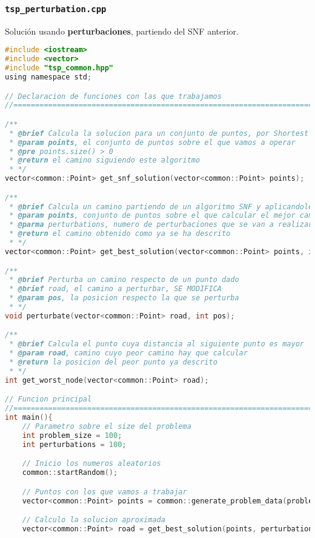 \documentclass[10pt, a4paper]{article}
\theoremstyle{theorem-style}
\theoremstyle{theorem-style}
\theoremstyle{definition-style}
\theoremstyle{remark-style}
\theoremstyle{example-style}
\theoremstyle{definition-style}
\theoremstyle{remark-style}
\begin{document}
\subsubsection*{\texttt{tsp\_perturbation.cpp}}

Solución usando \textbf{perturbaciones}, partiendo del SNF anterior.

\begin{lstlisting}[language=C]
#include <iostream>
#include <vector>
#include "tsp_common.hpp"
using namespace std;

// Declaracion de funciones con las que trabajamos
//==============================================================================

/**
 * @brief Calcula la solucion para un conjunto de puntos, por Shortest Neighbor First
 * @param points, el conjunto de puntos sobre el que vamos a operar
 * @pre points.size() > 0
 * @return el camino siguiendo este algoritmo
 * */
vector<common::Point> get_snf_solution(vector<common::Point> points);

/**
 * @brief Calcula un camino partiendo de un algoritmo SNF y aplicandole una serie de perturbaciones
 * @param points, conjunto de puntos sobre el que calcular el mejor camino posible
 * @parma perturbations, numero de perturbaciones que se van a realizar
 * @return el camino obtenido como ya se ha descrito
 * */
vector<common::Point> get_best_solution(vector<common::Point> points, int perturbations);

/**
 * @brief Perturba un camino respecto de un punto dado
 * @brief road, el camino a perturbar, SE MODIFICA
 * @param pos, la posicion respecto la que se perturba
 * */
void perturbate(vector<common::Point> road, int pos);

/**
 * @brief Calcula el punto cuya distancia al siguiente punto es mayor
 * @param road, camino cuyo peor camino hay que calcular 
 * @return la posicion del peor punto ya descrito
 * */
int get_worst_node(vector<common::Point> road);

// Funcion principal
//==============================================================================
int main(){
    // Parametro sobre el size del problema
    int problem_size = 100;
    int perturbations = 100;

    // Inicio los numeros aleatorios
    common::startRandom();

    // Puntos con los que vamos a trabajar
    vector<common::Point> points = common::generate_problem_data(problem_size);

    // Calculo la solucion aproximada
    vector<common::Point> road = get_best_solution(points, perturbations);


\end{lstlisting}
\end{document}
